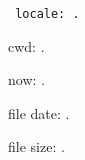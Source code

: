 

\tt
\TeXOSQueryLocale{\result}
locale: \result.

\TeXOSQueryCwd{\result}
cwd: \result.

\TeXOSQueryNow{\result}
now: \result.

file date: \result.

file size: \result.

\bye

